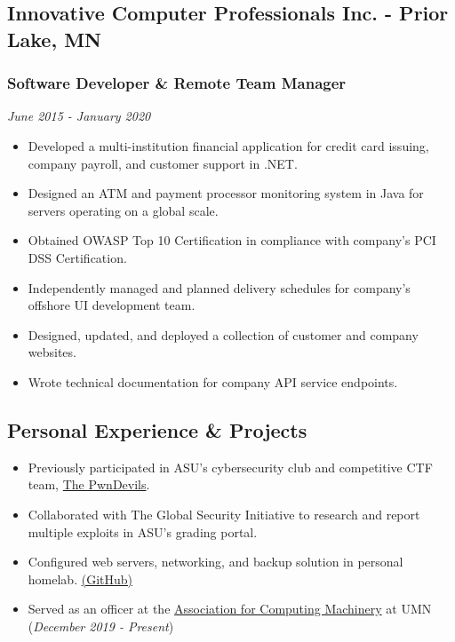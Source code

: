 \documentclass{article}
\begin{document}
\subsection{Innovative Computer Professionals Inc. - Prior Lake, MN}
\subsubsection{Software Developer \& Remote Team Manager}
\textit{June 2015 - January 2020}
\begin{itemize}[leftmargin=*]
	\item Developed a multi-institution financial application for credit card issuing, company payroll, and customer support in .NET.
	\item Designed an ATM and payment processor monitoring system in Java for servers operating on a global scale.
	\item Obtained OWASP Top 10 Certification in compliance with company’s PCI DSS Certification.
	\item Independently managed and planned delivery schedules for company’s offshore UI development team.
	\item Designed, updated, and deployed a collection of customer and company websites.
	\item Wrote technical documentation for company API service endpoints.
\end{itemize}


\subsection{Personal Experience \& Projects}
\begin{itemize}[leftmargin=*]
	\item Previously participated in ASU’s cybersecurity club and competitive CTF team, \href{https://pwndevils.com/}{The PwnDevils}.
	\item Collaborated with The Global Security Initiative to research and report multiple exploits in ASU's grading portal.
	\item Configured web servers, networking, and backup solution in personal homelab. \href{https://github.com/ColeGreenlee/GreenleeNet}{(GitHub)}
	\item Served as an officer at the \href{https://acm.umn.edu/}{Association for Computing Machinery} at UMN (\textit{December 2019 - Present})
\end{itemize}
\end{document}
